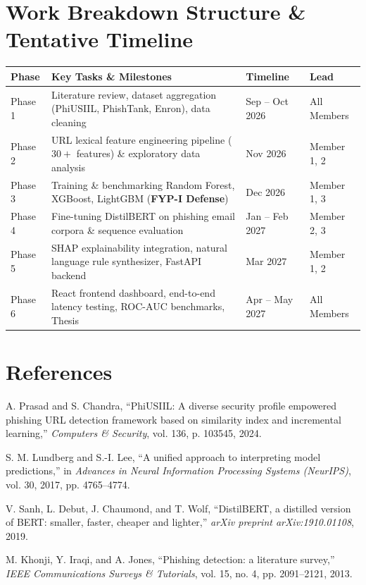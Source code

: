 \documentclass[10pt, a4paper]{article}
\begin{document}
\section{Work Breakdown Structure \& Tentative Timeline}
\begin{tabularx}{\textwidth}{@{} l X l l @{}}
    \toprule
    \textbf{Phase} & \textbf{Key Tasks \& Milestones} & \textbf{Timeline} & \textbf{Lead} \\
    \midrule
    Phase 1 & Literature review, dataset aggregation (PhiUSIIL, PhishTank, Enron), data cleaning & Sep -- Oct 2026 & All Members \\
    Phase 2 & URL lexical feature engineering pipeline ($30+$ features) \& exploratory data analysis & Nov 2026 & Member 1, 2 \\
    Phase 3 & Training \& benchmarking Random Forest, XGBoost, LightGBM (\textbf{FYP-I Defense}) & Dec 2026 & Member 1, 3 \\
    Phase 4 & Fine-tuning DistilBERT on phishing email corpora \& sequence evaluation & Jan -- Feb 2027 & Member 2, 3 \\
    Phase 5 & SHAP explainability integration, natural language rule synthesizer, FastAPI backend & Mar 2027 & Member 1, 2 \\
    Phase 6 & React frontend dashboard, end-to-end latency testing, ROC-AUC benchmarks, Thesis & Apr -- May 2027 & All Members \\
    \bottomrule
\end{tabularx}

\section{References}
\footnotesize
\begin{enumerate}[label={[\arabic*]}]
    \item A. Prasad and S. Chandra, ``PhiUSIIL: A diverse security profile empowered phishing URL detection framework based on similarity index and incremental learning,'' \textit{Computers \& Security}, vol. 136, p. 103545, 2024.
    \item S. M. Lundberg and S.-I. Lee, ``A unified approach to interpreting model predictions,'' in \textit{Advances in Neural Information Processing Systems (NeurIPS)}, vol. 30, 2017, pp. 4765--4774.
    \item V. Sanh, L. Debut, J. Chaumond, and T. Wolf, ``DistilBERT, a distilled version of BERT: smaller, faster, cheaper and lighter,'' \textit{arXiv preprint arXiv:1910.01108}, 2019.
    \item M. Khonji, Y. Iraqi, and A. Jones, ``Phishing detection: a literature survey,'' \textit{IEEE Communications Surveys \& Tutorials}, vol. 15, no. 4, pp. 2091--2121, 2013.
\end{enumerate}
\end{document}
